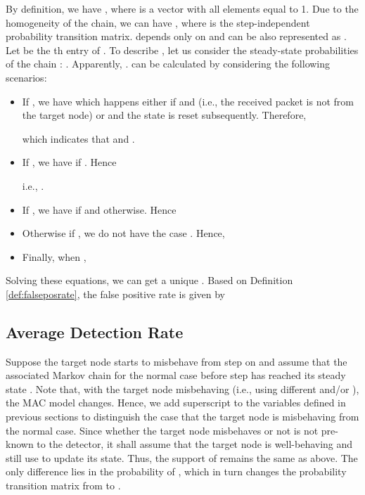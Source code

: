 \documentclass[conference]{IEEEtran}
\begin{document}
By definition, we have , where  is a vector with all elements equal to 1. Due to the homogeneity of the chain, we can have , where  is the step-independent probability transition matrix.  depends only on  and can be also represented as . Let  be the th entry of . To describe , let us consider the steady-state probabilities of the chain : . Apparently, .  can be calculated by considering the following scenarios:
\begin{itemize}
\item If , we have  which happens either if  and  (i.e., the received packet is not from the target node) or  and the state is reset subsequently. Therefore,

which indicates that  and .

\item If , we have  if . Hence

i.e., .

\item If , we have  if  and  otherwise. Hence


\item Otherwise if , we do not have the case . Hence,


\item Finally, when ,

\end{itemize}

Solving these equations, we can get a unique . Based on Definition \ref{def:falseposrate}, the false positive rate is given by



\subsection{Average Detection Rate}
Suppose the target node starts to misbehave from step  on and assume that the associated Markov chain  for the normal case before step  has reached its steady state . Note that, with the target node misbehaving (i.e., using different  and/or ), the MAC model changes. Hence, we add superscript  to the variables defined in previous sections to distinguish the case that the target node is misbehaving from the normal case. Since whether the target node misbehaves or not is not pre-known to the detector, it shall assume that the target node is well-behaving and still use  to update its state. Thus, the support of  remains the same as above. The only difference lies in the probability of , which in turn changes the probability transition matrix from  to .
\end{document}
